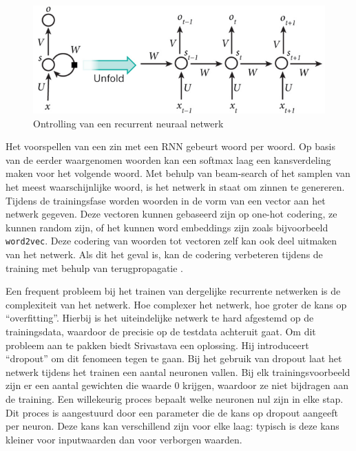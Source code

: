 \begin{figure}[tb]
    \centering
    \includegraphics[width=\linewidth]{Images/rnn.PNG}
    \caption{Ontrolling van een recurrent neuraal netwerk\cite{RNNTutorial}}
    \label{fig:rnn}
\end{figure}

Het voorspellen van een zin met een RNN gebeurt woord per woord. Op basis van de eerder waargenomen woorden kan een softmax laag een kansverdeling maken voor het volgende woord. Met behulp van beam-search of het samplen van het meest waarschijnlijke woord, is het netwerk in staat om zinnen te genereren. Tijdens de trainingsfase worden woorden in de vorm van een vector aan het netwerk gegeven. Deze vectoren kunnen gebaseerd zijn op one-hot codering, ze kunnen random zijn, of het kunnen word embeddings zijn zoals bijvoorbeeld \texttt{word2vec}\cite{Mikolov2013}. Deze codering van woorden tot vectoren zelf kan ook deel uitmaken van het netwerk. Als dit het geval is, kan de codering verbeteren tijdens de training met behulp van terugpropagatie .

Een frequent probleem bij het trainen van dergelijke recurrente netwerken is de complexiteit van het netwerk. Hoe complexer het netwerk, hoe groter de kans op ``overfitting''. Hierbij is het uiteindelijke netwerk te hard afgestemd op de trainingsdata, waardoor de precisie op de testdata achteruit gaat. Om dit probleem aan te pakken biedt Srivastava\cite{Srivastava2013} een oplossing. Hij introduceert ``dropout'' om dit fenomeen tegen te gaan. Bij het gebruik van dropout laat het netwerk tijdens het trainen een aantal neuronen vallen. Bij elk trainingsvoorbeeld zijn er een aantal gewichten die waarde 0 krijgen, waardoor ze niet bijdragen aan de training. Een willekeurig proces bepaalt welke neuronen nul zijn in elke stap. Dit proces is aangestuurd door een parameter die de kans op dropout aangeeft per neuron. Deze  kans kan verschillend zijn voor elke laag: typisch is deze kans kleiner voor inputwaarden dan voor verborgen waarden.

